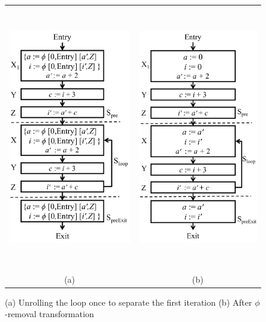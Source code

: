 \begin{figure}[H]
\begin{center}
\begin{tabular}{cc}
\includegraphics[height=4.5in]{fig-proposal/algorithm-two-iterations}
&
\includegraphics[height=4.5in]{fig-proposal/algorithm-after-phi-removal}
\\
(a) & (b)
\\
\end{tabular}
\end{center}
\caption{(a) Unrolling the loop once to separate the first iteration (b) After $\phi$-removal transformation}
\label{fig:algo1-3}
\end{figure}


